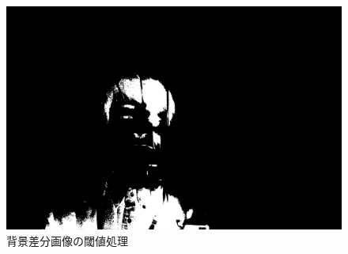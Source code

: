 \begin{figure}[H]
\begin{minipage}[b]{.49\textwidth}
\begin{minipage}[b]{.3\textwidth}
            \centering
            \includegraphics[keepaspectratio,width=\textwidth]{../../Figures/05_63.png}
        \end{minipage}
        \caption{背景差分画像の閾値処理}
    \end{minipage}
\end{figure}
\newpage
